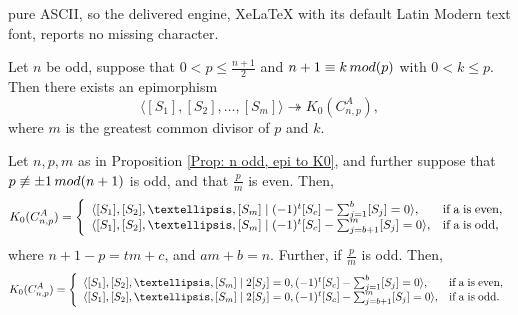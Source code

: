 \documentclass[10pt,a4paper]{amsart}
\def \text{\mbox}
\renewcommand{\mod}{\mathop{\rm mod}\nolimits}%
\begin{document}
pure ASCII, so the delivered engine, XeLaTeX with its default Latin Modern text font, reports no missing character.
\begin{proposition}\label{Prop: n odd, epi to K0}
	Let $n$ be odd, suppose that $0 < p \leq \frac{n+1}{2}$ and $n+1 \equiv k \mod (p)$ with $0 < k \leq p$.
	Then there exists an epimorphism
	\[
	\langle [S_1], [S_2],\ldots, [S_m] \rangle \twoheadrightarrow K_0(C_{n,p}^A),
	\]
	where $m$ is the greatest common divisor of $p$ and $k$.
\end{proposition}

\begin{theorem}\label{Thm: n odd, p odd}
	Let $n,p,m$ as in Proposition \ref{Prop: n odd, epi to K0}, and further suppose that $p \not\equiv \pm 1 \mod (n+1)$ is odd, and that $\frac{p}{m}$ is even.
	Then,
\[ K_0(C_{n,p}^A) =\left\{
\begin{array}{ll}
\langle [S_1], [S_2], \ldots, [S_m] \mid (-1)^t [S_c] - \sum_{j=1}^{b} [S_j] = 0 \rangle, & \text{if\;} $a$ \text{\;is\;even},\\
		\langle [S_1], [S_2], \ldots, [S_m] \mid (-1)^t [S_c] - \sum_{j=b+1}^{m} [S_j] = 0 \rangle, & \text{if\;} $a$ \text{\;is\;odd},
\end{array}
\right.
\]	
	where $n+1-p = tm +c$, and $am+b=n$.
	Further, if $\frac{p}{m}$ is odd.
	Then,
\[ K_0(C_{n,p}^A) =\left\{
\begin{array}{ll}
\langle [S_1], [S_2], \ldots, [S_m] \mid 2[S_j] = 0, (-1)^t [S_c] - \sum_{j=1}^{b} [S_j] = 0\rangle, & \text{if\;} $a$ \text{\;is\;even},\\
		\langle [S_1], [S_2], \ldots, [S_m] \mid 2[S_j] = 0, (-1)^t [S_c] - \sum_{j=b+1}^{m} [S_j] = 0 \rangle, & \text{if\;} $a$ \text{\;is\;odd}.
\end{array}
\right.
\]	
\end{theorem}
\end{document}

